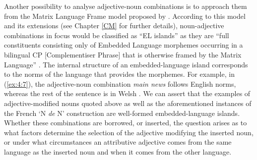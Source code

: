 Another possibility to analyse adjective-noun combinations is to approach them from the Matrix Language Frame model proposed by \citet{myers-scotton-duelling-1993}. According to this model and its extensions (see Chapter \ref{CM} for further details), noun-adjective combinations in focus would be classified as ``EL islands'' as they are ``full constituents consisting only of Embedded Language morphemes occurring in a bilingual CP [Complementiser Phrase] that is otherwise framed by the Matrix Language'' \citep[139]{myers-scotton-contact-2002}. The internal structure of an embedded-language island corresponds to the norms of the language that provides the morphemes. For example, in (\ref{ex:4:7}), the adjective-noun combination \textit{main news} follows English norms, whereas the rest of the sentence is in Welsh \citep[cf.][261]{deuchar-congruence-2005}. We can assert that the examples of adjective-modified nouns quoted above as well as the aforementioned instances of the French `N \textit{de} N' construction are well-formed embedded-language islands. Whether these combinations are borrowed, or inserted, the question arises as to what factors determine the selection of the adjective modifying the inserted noun, or under what circumstances an attributive adjective comes from the same language as the inserted noun and when it comes from the other language.

